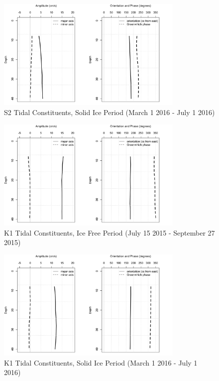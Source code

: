 \documentclass[12pt]{dforeport}
\begin{document}
\begin{figure}  
\centering
\includegraphics[width = 0.8\textwidth]{./figures/56_S2TC_si_2015.png}
\caption[S2 Tidal Constituents, Solid Ice, 2015]{S2 Tidal Constituents, Solid Ice Period (March 1 2016 - July 1 2016)}
\label{f:s2_si_2015}
\end{figure}


\begin{figure}  
\centering
\includegraphics[width = 0.8\textwidth]{./figures/57_K1TC_if_2015.png}
\caption[K1 Tidal Constituents, Ice free, 2015]{K1 Tidal Constituents, Ice Free Period (July 15 2015 - September 27 2015)}
\label{f:k1_if_2015}
\end{figure}

\begin{figure}  
\centering
\includegraphics[width = 0.8\textwidth]{./figures/58_K1TC_si_2015.png}
\caption[K1 Tidal Constituents, Solid Ice, 2015]{K1 Tidal Constituents, Solid Ice Period (March 1 2016 - July 1 2016)}
\label{f:k1_si_2015}
\end{figure}
\end{document}
